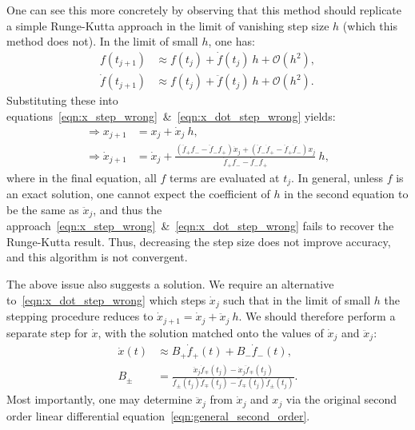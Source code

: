 One can see this more concretely by observing that this method should replicate a simple Runge-Kutta approach in the limit of vanishing step size \(h\) (which this method does not). In the limit of small \(h\), one has:
\begin{align}
    f(t_{j+1}) &\approx f(t_j) + \dot{f}(t_j) \: h +\mathcal{O}(h^2), \\
    \dot{f}(t_{j+1}) &\approx f(t_j) + \ddot{f}(t_j) \: h +\mathcal{O}(h^2). 
\end{align}
Substituting these into equations~\eqref{eqn:x_step_wrong}~\&~\eqref{eqn:x_dot_step_wrong} yields:
\begin{align}
    \Rightarrow x_{j+1} &= x_j + \dot{x}_j \: h , \\
    \Rightarrow \dot{x}_{j+1} &= \dot{x}_j + 
    \frac{(\ddot{f}_+ f_- - \ddot{f}_- f_+)\dot{x}_j  +( \ddot{f}_- \dot{f}_+- \ddot{f}_+ \dot{f}_-)x_j}{\dot{f}_+ f_- - \dot{f}_- f_+}\: h
    , 
\end{align}
where in the final equation, all \(f\) terms are evaluated at \(t_j\). In general, unless \(f\) is an exact solution, one cannot expect the coefficient of \(h\) in the second equation to be the same as \(\ddot{x}_j\), and thus the approach~\eqref{eqn:x_step_wrong}~\&~\eqref{eqn:x_dot_step_wrong} fails to recover the Runge-Kutta result. Thus, decreasing the step size does not improve accuracy, and this algorithm is not convergent.

The above issue also suggests a solution. We require an alternative to~\eqref{eqn:x_dot_step_wrong} which steps \(\dot{x}_j\) such that in the limit of small \(h\) the stepping procedure reduces to \(\dot{x}_{j+1} = \dot{x}_j + \ddot{x}_j\: h\).
We should therefore perform a separate step for \(\dot{x}\), with the solution matched onto the values of \(\dot{x}_j\) and \(\ddot{x}_j\):
\begin{align}
    \dot{x}(t) &\approx  B_+ \dot{f}_+(t) + B_- \dot{f}_-(t), \\
    B_\pm &= \frac{\ddot{x}_j \dot{f}_\mp(t_j) - \dot{x}_j \ddot{f}_\mp(t_j) }{\ddot{f}_\pm(t_j) \dot{f}_\mp(t_j) - \ddot{f}_\mp(t_j) \ddot{f}_\pm(t_j)}. 
    \label{eqn:Bpm}
\end{align}
Most importantly, one may determine \(\ddot{x}_j\) from \(\dot{x}_j\) and \(x_j\) via the original second order linear differential equation~\eqref{eqn:general_second_order}.

